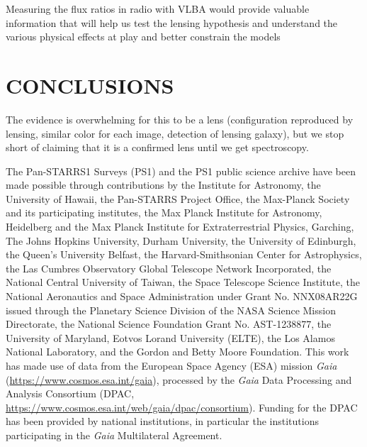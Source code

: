 \documentclass[manuscript]{aastex}
\begin{document}
Measuring the flux ratios in radio with VLBA would provide valuable information that will help us test the lensing hypothesis and understand the various physical effects at play and better constrain the models 


\section{CONCLUSIONS}

The evidence is overwhelming for this to be a lens (configuration reproduced by lensing, similar color for each image, detection of lensing galaxy), but we stop short of claiming that it is a confirmed lens until we get spectroscopy.



\acknowledgments

The Pan-STARRS1 Surveys (PS1) and the PS1 public science archive have been made possible through contributions by the Institute for Astronomy, the University of Hawaii, the Pan-STARRS Project Office, the Max-Planck Society and its participating institutes, the Max Planck Institute for Astronomy, Heidelberg and the Max Planck Institute for Extraterrestrial Physics, Garching, The Johns Hopkins University, Durham University, the University of Edinburgh, the Queen's University Belfast, the Harvard-Smithsonian Center for Astrophysics, the Las Cumbres Observatory Global Telescope Network Incorporated, the National Central University of Taiwan, the Space Telescope Science Institute, the National Aeronautics and Space Administration under Grant No. NNX08AR22G issued through the Planetary Science Division of the NASA Science Mission Directorate, the National Science Foundation Grant No. AST-1238877, the University of Maryland, Eotvos Lorand University (ELTE), the Los Alamos National Laboratory, and the Gordon and Betty Moore Foundation.
This work has made use of data from the European Space Agency (ESA)
mission {\it Gaia} (\url{https://www.cosmos.esa.int/gaia}), processed by
the {\it Gaia} Data Processing and Analysis Consortium (DPAC,
\url{https://www.cosmos.esa.int/web/gaia/dpac/consortium}). Funding
for the DPAC has been provided by national institutions, in particular
the institutions participating in the {\it Gaia} Multilateral Agreement.
\end{document}
